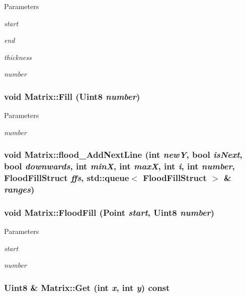 \begin{DoxyParams}{Parameters}
\item[{\em start}]\item[{\em end}]\item[{\em thickness}]\item[{\em number}]\end{DoxyParams}
\hypertarget{classMatrix_a4a7c3875be94e94786db920c441973e6}{
\subsubsection[{Fill}]{\setlength{\rightskip}{0pt plus 5cm}void Matrix::Fill (Uint8 {\em number})}}
\label{classMatrix_a4a7c3875be94e94786db920c441973e6}

\begin{DoxyParams}{Parameters}
\item[{\em number}]\end{DoxyParams}
\hypertarget{classMatrix_aaa3962d9bf27f654bd6771a8d5bfaeac}{
\subsubsection[{flood\_\-AddNextLine}]{\setlength{\rightskip}{0pt plus 5cm}void Matrix::flood\_\-AddNextLine (int {\em newY}, \/  bool {\em isNext}, \/  bool {\em downwards}, \/  int {\em minX}, \/  int {\em maxX}, \/  int {\em i}, \/  int {\em number}, \/  {\bf FloodFillStruct} {\em ffs}, \/  std::queue$<$ {\bf FloodFillStruct} $>$ \& {\em ranges})}}
\label{classMatrix_aaa3962d9bf27f654bd6771a8d5bfaeac}
\hypertarget{classMatrix_a7209ed0123ff3686f0d0f7f4e6ac7094}{
\subsubsection[{FloodFill}]{\setlength{\rightskip}{0pt plus 5cm}void Matrix::FloodFill ({\bf Point} {\em start}, \/  Uint8 {\em number})}}
\label{classMatrix_a7209ed0123ff3686f0d0f7f4e6ac7094}

\begin{DoxyParams}{Parameters}
\item[{\em start}]\item[{\em number}]\end{DoxyParams}
\hypertarget{classMatrix_a06fc8df480cd88daf69eaa05867cb7bd}{
\subsubsection[{Get}]{\setlength{\rightskip}{0pt plus 5cm}Uint8 \& Matrix::Get (int {\em x}, \/  int {\em y}) const}}
\label{classMatrix_a06fc8df480cd88daf69eaa05867cb7bd}

